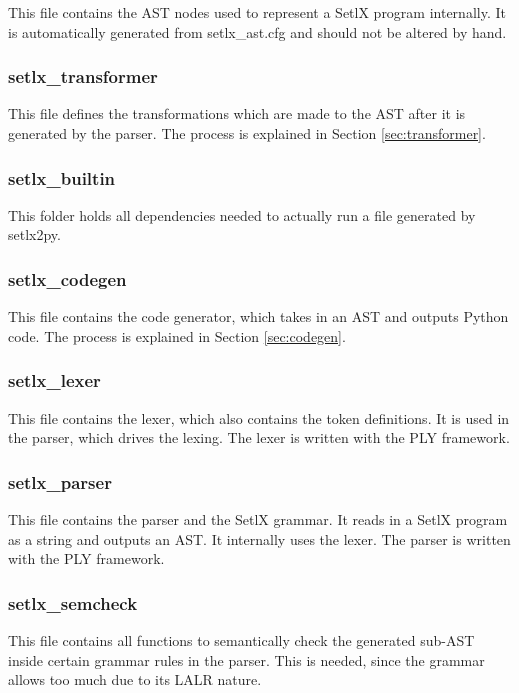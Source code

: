 This file contains the AST nodes used to represent a SetlX program internally. It is automatically generated from setlx\_ast.cfg and should not be altered by hand.

%
\subsubsection{setlx\_transformer}

This file defines the transformations which are made to the AST after it is generated by the parser. The process is explained in Section \ref{sec:transformer}.

%
\subsubsection{setlx\_builtin}
This folder holds all dependencies needed to actually run a file generated by setlx2py.

%
\subsubsection{setlx\_codegen}

This file contains the code generator, which takes in an AST and outputs Python code. The process is explained in Section \ref{sec:codegen}.

%
\subsubsection{setlx\_lexer}

This file contains the lexer, which also contains the token definitions. It is used in the parser, which drives the lexing. The lexer is written with the PLY framework.

%
\subsubsection{setlx\_parser}

This file contains the parser and the SetlX grammar. It reads in a SetlX program as a string and outputs an AST. It internally uses the lexer. The parser is written with the PLY framework.

%
\subsubsection{setlx\_semcheck}

This file contains all functions to semantically check the generated sub-AST inside certain grammar rules in the parser. This is needed, since the grammar allows too much due to its LALR nature.

